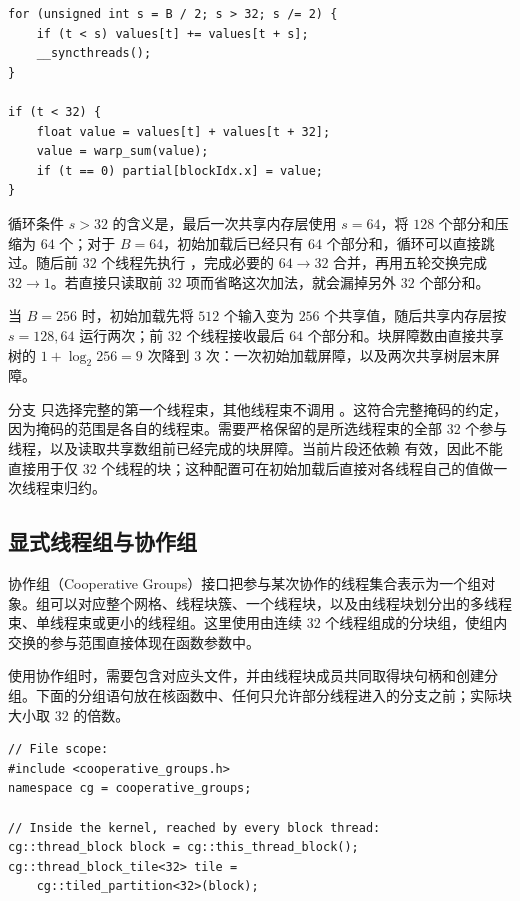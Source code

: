 \noindent\begin{minipage}{\linewidth}
\begin{lstlisting}[caption={共享内存树结束后，把最后64个部分和交给一个线程束},label={l15:lst:code7}]
for (unsigned int s = B / 2; s > 32; s /= 2) {
    if (t < s) values[t] += values[t + s];
    __syncthreads();
}

if (t < 32) {
    float value = values[t] + values[t + 32];
    value = warp_sum(value);
    if (t == 0) partial[blockIdx.x] = value;
}
\end{lstlisting}
\end{minipage}

循环条件 $s>32$ 的含义是，最后一次共享内存层使用 $s=64$，将 $128$ 个部分和压缩为 $64$ 个；对于 $B=64$，初始加载后已经只有 $64$ 个部分和，循环可以直接跳过。随后前 $32$ 个线程先执行 \mbox{}，完成必要的 $64\to32$ 合并，再用五轮交换完成 $32\to1$。若直接只读取前 $32$ 项而省略这次加法，就会漏掉另外 $32$ 个部分和。

当 $B=256$ 时，初始加载先将 $512$ 个输入变为 $256$ 个共享值，随后共享内存层按 $s=128,64$ 运行两次；前 $32$ 个线程接收最后 $64$ 个部分和。块屏障数由直接共享树的 $1+\log_2 256=9$ 次降到 $3$ 次：一次初始加载屏障，以及两次共享树层末屏障。

分支 \mbox{} 只选择完整的第一个线程束，其他线程束不调用 \mbox{}。这符合完整掩码的约定，因为掩码的范围是各自的线程束。需要严格保留的是所选线程束的全部 $32$ 个参与线程，以及读取共享数组前已经完成的块屏障。当前片段还依赖 \mbox{} 有效，因此不能直接用于仅 $32$ 个线程的块；这种配置可在初始加载后直接对各线程自己的值做一次线程束归约。

\subsection{显式线程组与协作组}

协作组（Cooperative Groups）接口把参与某次协作的线程集合表示为一个组对象。组可以对应整个网格、线程块簇、一个线程块，以及由线程块划分出的多线程束、单线程束或更小的线程组。这里使用由连续 $32$ 个线程组成的分块组，使组内交换的参与范围直接体现在函数参数中。

使用协作组时，需要包含对应头文件，并由线程块成员共同取得块句柄和创建分组。下面的分组语句放在核函数中、任何只允许部分线程进入的分支之前；实际块大小取 $32$ 的倍数。

\noindent\begin{minipage}{\linewidth}
\begin{lstlisting}[caption={在核函数内由整个线程块共同建立32线程分组},label={l15:lst:code8}]
// File scope:
#include <cooperative_groups.h>
namespace cg = cooperative_groups;

// Inside the kernel, reached by every block thread:
cg::thread_block block = cg::this_thread_block();
cg::thread_block_tile<32> tile =
    cg::tiled_partition<32>(block);
\end{lstlisting}
\end{minipage}

